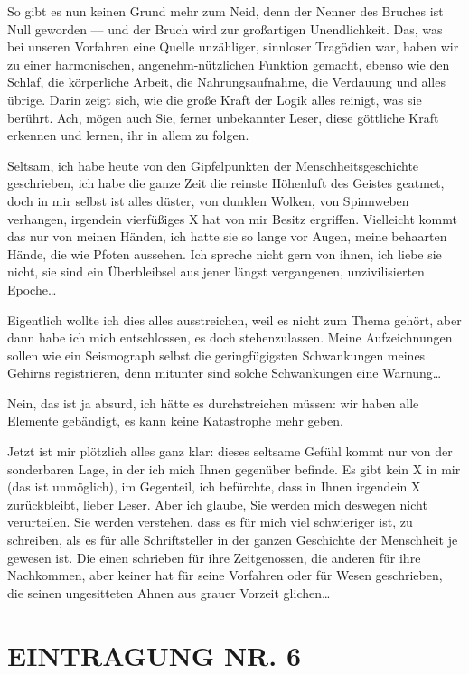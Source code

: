 So gibt es nun keinen Grund mehr zum Neid, denn der Nenner des
Bruches  ist Null geworden — und der Bruch wird zur
großartigen Unendlichkeit. Das, was bei unseren Vorfahren eine
Quelle unzähliger, sinnloser Tragödien war, haben wir zu einer
harmonischen, angenehm-nützlichen Funktion gemacht, ebenso wie den
Schlaf, die körperliche Arbeit, die Nahrungsaufnahme, die Verdauung
und alles übrige. Darin zeigt sich, wie die große Kraft der Logik
alles reinigt, was sie berührt. Ach, mögen auch Sie, ferner
unbekannter Leser, diese göttliche Kraft erkennen und lernen, ihr
in allem zu folgen.

Seltsam, ich habe heute von den Gipfelpunkten
der Menschheitsgeschichte geschrieben, ich habe die ganze Zeit die
reinste Höhenluft des Geistes geatmet, doch in mir selbst ist alles
düster, von dunklen Wolken, von Spinnweben verhangen, irgendein
vierfüßiges X hat von mir Besitz ergriffen. Vielleicht kommt das
nur von meinen Händen, ich hatte sie so lange vor Augen, meine
behaarten Hände, die wie Pfoten aussehen. Ich spreche nicht gern
von ihnen, ich liebe sie nicht, sie sind ein Überbleibsel aus jener
längst vergangenen, unzivilisierten Epoche\ldots{}

Eigentlich wollte ich
dies alles ausstreichen, weil es nicht zum Thema gehört, aber dann
habe ich mich entschlossen, es doch stehenzulassen. Meine
Aufzeichnungen sollen wie ein Seismograph selbst die
geringfügigsten Schwankungen meines Gehirns registrieren, denn
mitunter sind solche Schwankungen eine Warnung\ldots{}

Nein, das ist ja absurd, ich hätte es durchstreichen müssen: wir
haben alle Elemente gebändigt, es kann keine Katastrophe mehr
geben.

Jetzt ist mir plötzlich alles ganz klar: dieses seltsame Gefühl
kommt nur von der sonderbaren Lage, in der ich mich Ihnen gegenüber
befinde. Es gibt kein X in mir (das ist unmöglich), im Gegenteil,
ich befürchte, dass in Ihnen irgendein X zurückbleibt, lieber
Leser. Aber ich glaube, Sie werden mich deswegen nicht verurteilen.
Sie werden verstehen, dass es für mich viel schwieriger ist, zu
schreiben, als es für alle Schriftsteller in der ganzen Geschichte
der Menschheit je gewesen ist. Die einen schrieben für ihre
Zeitgenossen, die anderen für ihre Nachkommen, aber keiner hat für
seine Vorfahren oder für Wesen geschrieben, die seinen ungesitteten
Ahnen aus grauer Vorzeit glichen\ldots{}

\section{EINTRAGUNG NR. 6}

